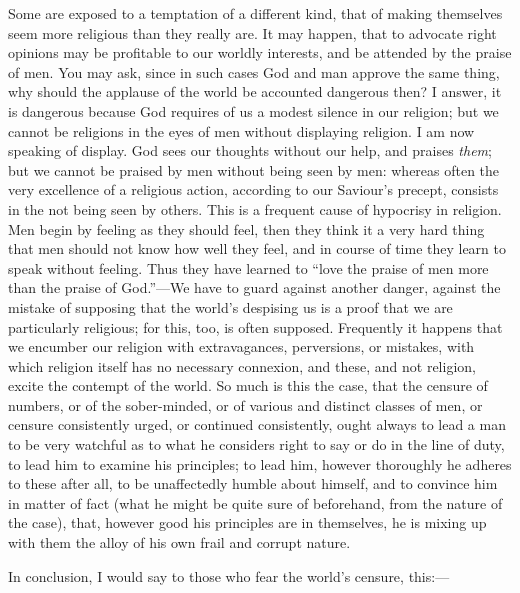 Some are exposed to a temptation of a different kind, that of
making themselves seem more religious than they really are. It may
happen, that to advocate right opinions may be profitable to our
worldly interests, and be attended by the praise of men. You may ask,
since in such cases God and man approve the same thing, why should the
applause of the world be accounted dangerous then? I answer, it is
dangerous because God requires of us a modest silence in our religion;
but we cannot be religions in the eyes of men without displaying
religion. I am now speaking of display. God sees our thoughts without
our help, and praises \emph{them}; but we cannot be praised by men
without being seen by men: whereas often the very excellence of a
religious action, according to our Saviour's precept, consists in the
not being seen by others. This is a frequent cause of hypocrisy in
religion. Men begin by feeling as they should feel, then they think it
a very hard thing that men should not know how well they feel, and in
course of time they learn to speak without feeling. Thus they have
learned to ``love the praise of men more than the praise of
God.''—We have to guard against another danger, against the
mistake of supposing that the world's despising us is a proof that we
are particularly religious; for this, too, is often supposed.
Frequently it happens that we encumber our religion with
extravagances, perversions, or mistakes, with which religion itself
has no necessary connexion, and these, and not religion, excite the
contempt of the world. So much is this the case, that the censure of
numbers, or of the sober-minded, or of various and distinct classes of
men, or censure consistently urged, or continued consistently, ought
always to lead a man to be very watchful as to what he considers right
to say or do in the line of duty, to lead him to examine his
principles; to lead him, however thoroughly he adheres to these after
all, to be unaffectedly humble about himself, and to convince him in
matter of fact (what he might be quite sure of beforehand, from the
nature of the case), that, however good his principles are in
themselves, he is mixing up with them the alloy of his own frail and
corrupt nature.

In conclusion, I would say to those who fear the world's censure,
this:—

